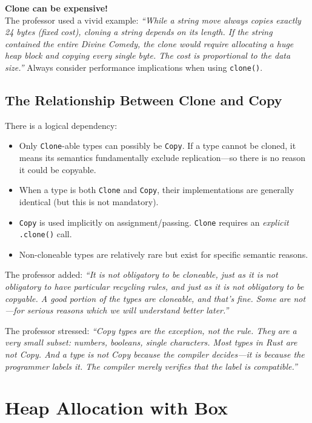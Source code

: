 \begin{warningbox}
\textbf{Clone can be expensive!} \\
The professor used a vivid example: \emph{``While a string move always copies exactly 24 bytes (fixed cost), cloning a string depends on its length. If the string contained the entire Divine Comedy, the clone would require allocating a huge heap block and copying every single byte. The cost is proportional to the data size.''}  Always consider performance implications when using \texttt{clone()}.
\end{warningbox}

\subsection{The Relationship Between Clone and Copy}

There is a logical dependency:
\begin{itemize}
    \item Only \texttt{Clone}-able types can possibly be \texttt{Copy}. If a type cannot be cloned, it means its semantics fundamentally exclude replication---so there is no reason it could be copyable.
    \item When a type is both \texttt{Clone} and \texttt{Copy}, their implementations are generally identical (but this is not mandatory).
    \item \texttt{Copy} is used implicitly on assignment/passing. \texttt{Clone} requires an \emph{explicit} \texttt{.clone()} call.
    \item Non-cloneable types are relatively rare but exist for specific semantic reasons.
\end{itemize}

The professor added: \emph{``It is not obligatory to be cloneable, just as it is not obligatory to have particular recycling rules, and just as it is not obligatory to be copyable. A good portion of the types are cloneable, and that's fine. Some are not---for serious reasons which we will understand better later.''}

The professor stressed: \emph{``Copy types are the exception, not the rule. They are a very small subset: numbers, booleans, single characters. Most types in Rust are not Copy. And a type is not Copy because the compiler decides---it is because the programmer labels it. The compiler merely verifies that the label is compatible.''}

\section{Heap Allocation with Box}

